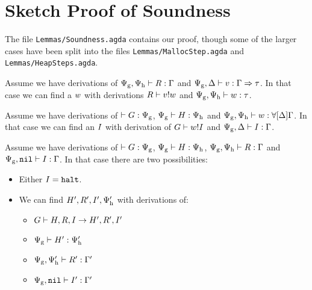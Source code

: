 \chapter{Sketch Proof of Soundness}
\label{sec:soundness-proof}

The file \texttt{Lemmas/Soundness.agda} contains our proof, though some of the
larger cases have been split into the files \texttt{Lemmas/MallocStep.agda} and
\texttt{Lemmas/HeapSteps.agda}.


\begin{lemma}
  Assume we have derivations of
  ${\Psi_{\mathrm{g}},\Psi_{\mathrm{h}}} |- {R} : {\Gamma}$ and
  ${\Psi_{\mathrm{g}},\Delta} |- {v} : {\Gamma => \tau}$. In that case we
  can find a $w$ with derivations ${R} |- {v} ! {w}$
  and ${\Psi_{\mathrm{g}},\Psi_{\mathrm{h}}} |- {w} : {\tau}$.
\end{lemma}

\begin{lemma}
  Assume we have derivations of $|- {G} : {\Psi_{\mathrm{g}}}$,
  ${\Psi_{\mathrm{g}}} |- {H} : {\Psi_{\mathrm{h}}}$ and
  ${\Psi_{\mathrm{g}},\Psi_{\mathrm{h}}} |- {w} : {\forall[ \Delta ]
    \Gamma}$. In that case we can find an $I$ with derivation of
  ${G} |- {w} ! {I}$ and
  ${\Psi_{\mathrm{g}}, \Delta} |- {I} : {\Gamma}$.
\end{lemma}

\begin{lemma}
  Assume we have derivations of $|- {G} : {\Psi_{\mathrm{g}}}$,
  ${\Psi_{\mathrm{g}}} |- {H} : {\Psi_{\mathrm{h}}}$,
  ${\Psi_{\mathrm{g}},\Psi_{\mathrm{h}}} |- {R} : {\Gamma}$ and
  ${\Psi_{\mathrm{g}}, \mathtt{nil}} |- {I} : {\Gamma}$. In that case
  there are two possibilities:
  \begin{itemize}
  \item Either $I = \mathtt{halt}$.
  \item We can find $H', R', I', \Psi_{\mathrm{h}}'$ with
    derivations of:
    \begin{itemize}
    \item ${G} |- {H, R, I} -> {H', R', I'}$
    \item ${\Psi_{\mathrm{g}}} |- {H'} : {\Psi_{\mathrm{h}}'}$
    \item ${\Psi_{\mathrm{g}},\Psi_{\mathrm{h}}'} |- {R'} : {\Gamma'}$
    \item ${\Psi_{\mathrm{g}}, \mathtt{nil}} |- {I'} : {\Gamma'}$
    \end{itemize}
  \end{itemize}
\end{lemma}


